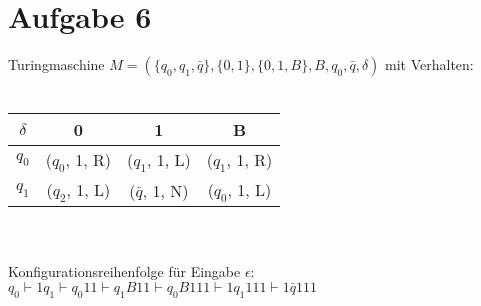 \documentclass[a4paper,11pt]{scrartcl}
\begin{document}
	\section*{Aufgabe 6}
	Turingmaschine $M= (\{q_0 , q_1 , \bar{q}\}, \{0,1\}, \{0,1,B\}, B, q_0, \bar{q}, \delta)$ mit Verhalten:\\\\
	\begin{tabular}{c | c c c}
	$\delta$ & 0 & 1 & B \\
	\hline
	$q_0$ & ($q_0$, 1, R) & ($q_1$, 1, L) & ($q_1$, 1, R) \\
	$q_1$ & ($q_2$, 1, L) & ($\bar{q}$, 1, N) & ($q_0$, 1, L) \\
	\end{tabular}
	\\\\Konfigurationsreihenfolge für Eingabe $\epsilon$: \\
	$q_0 \vdash 1 q_1 \vdash q_0 11 \vdash q_1 B11 \vdash q_0 B111 \vdash 1 q_1 111 \vdash 1 \bar{q} 111$
	
\end{document}
